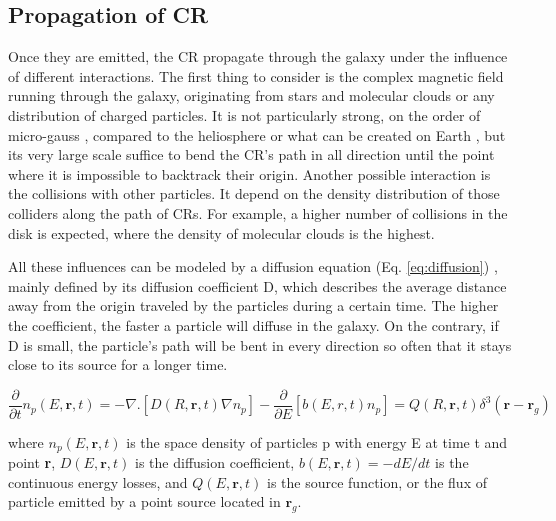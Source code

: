\subsection{Propagation of CR}

Once they are emitted, the CR propagate through the galaxy under the influence of different interactions.
The first thing to consider is the complex magnetic field running through the galaxy, originating from stars and molecular clouds or any distribution of charged particles. It is not particularly strong, on the order of micro-gauss \cite{Daniel1975} \cite{Farrar2012}, compared to the heliosphere or what can be created on Earth \cite{Gleeson1968}, but its very large scale suffice to bend the CR's path in all direction until the point where it is impossible to backtrack their origin.
Another possible interaction is the collisions with other particles. It depend on the density distribution of those colliders along the path of CRs. For example, a higher number of collisions in the disk is expected, where the density of molecular clouds is the highest.

All these influences can be modeled by a diffusion equation (Eq. \ref{eq:diffusion}) \cite{Gazizov2006}, mainly defined by its diffusion coefficient D, which describes the average distance away from the origin traveled by the particles during a certain time. The higher the coefficient, the faster a particle will diffuse in the galaxy. On the contrary, if D is small, the particle's path will be bent in every direction so often that it stays close to its source for a longer time. 

\begin{equation}
\label{eq:diffusion}
\frac{\partial}{\partial t} n_p(E, \textbf{r}, t) = -\nabla . \left[ D(R, \textbf{r}, t) \nabla n_p  \right] - \frac{\partial}{\partial E} \left[ b(E,r,t)n_p \right] = Q(R,\textbf{r},t) \delta^3(\textbf{r}-\textbf{r}_g)
\end{equation}

where $n_p(E,\textbf{r},t)$ is the space density of particles p with energy E at time t and point \textbf{r}, $D(E,\textbf{r},t)$ is the diffusion coefficient, $b(E,\textbf{r},t) = -dE/dt$ is the continuous energy losses, and $Q(E,\textbf{r},t)$ is the source function, or the flux of particle emitted by a point source located in $\textbf{r}_g$.

